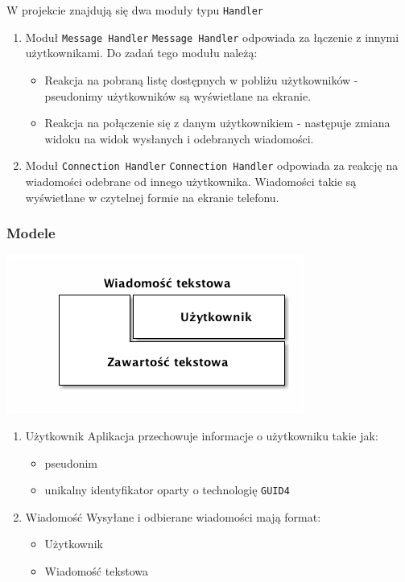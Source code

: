 \documentclass[a4paper, titlepage]{article}
\begin{document}
W projekcie znajdują się dwa moduły typu \texttt{Handler}
\begin{enumerate}
\item Moduł \texttt{Message Handler}
\texttt{Message Handler} odpowiada za łączenie z innymi użytkownikami.
Do zadań tego modułu należą:
\begin{itemize}
\item Reakcja na pobraną listę dostępnych w pobliżu użytkowników - pseudonimy użytkowników są wyświetlane na ekranie.
\item Reakcja na połączenie się z danym użytkownikiem - następuje zmiana widoku na widok wysłanych i odebranych wiadomości.
\end{itemize}
\item Moduł \texttt{Connection Handler}
\texttt{Connection Handler} odpowiada za reakcję na wiadomości odebrane od innego użytkownika. Wiadomości takie są wyświetlane w czytelnej formie na ekranie telefonu.
\end{enumerate}
\subsubsection{Modele}
\label{sec:orgc0d330a}

\begin{center}
\includegraphics[width=.9\linewidth]{models.png}
\end{center}

\begin{enumerate}
\item Użytkownik
\label{sec:org5dd4790}
Aplikacja przechowuje informacje o użytkowniku takie jak:
\begin{itemize}
\item pseudonim
\item unikalny identyfikator oparty o technologię \texttt{GUID4}
\end{itemize}
\item Wiadomość
\label{sec:org74946ed}
Wysyłane i odbierane wiadomości mają format:
\begin{itemize}
\item Użytkownik
\item Wiadomość tekstowa
\end{itemize}
\end{enumerate}
\end{document}
